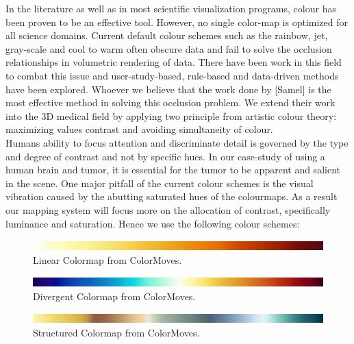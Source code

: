 In the literature as well as in most scientific visualization programs, colour has been proven to be an effective tool.  However, no single color-map is optimized for all science domains.  Current default colour schemes such as the rainbow, jet, gray-scale and cool to warm often obscure data and fail to solve the occlusion relationships in volumetric rendering of data.  There have been work in this field to combat this issue and user-study-based, rule-based and data-driven methods have been explored.  Whoever we believe that the work done by [Samel] is the most effective method in solving this occlusion problem.  We extend their work into the 3D medical field by applying two principle from artistic colour theory: maximizing values contrast and avoiding simultaneity of colour.\\

Humans ability to focus attention and discriminate detail is governed by the type and degree of contrast and not by specific hues.  In our case-study of using a human brain and tumor, it is essential for the tumor to be apparent and salient in the scene.  One major pitfall of the current colour schemes is the visual vibration caused by the abutting saturated hues of the colourmaps.  As a result our mapping system will focus more on the allocation of contrast, specifically luminance and saturation. Hence we use the following colour schemes:\\

\begin{figure}[h]
 \centering %
 \includegraphics[width=\columnwidth]{pictures/orange-5.png}
 \caption{Linear Colormap from ColorMoves.}
 \label{fig:orange5}
\end{figure}

\begin{figure}[h]
 \centering %
 \includegraphics[width=\columnwidth]{pictures/divergent-1.png}
 \caption{Divergent Colormap from ColorMoves.}
 \label{fig:divergent1}
\end{figure}

\begin{figure}[h]
 \centering %
 \includegraphics[width=\columnwidth]{pictures/altstruct-1.png}
 \caption{Structured Colormap from ColorMoves.}
 \label{fig:struct1}
\end{figure}
